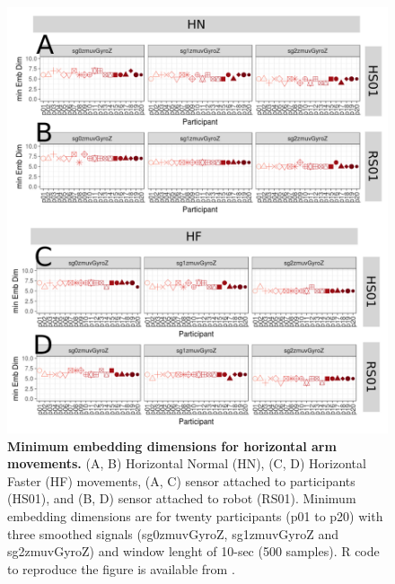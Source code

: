 \begin{figure}[!h]
\centering
\includegraphics[width=1.0\textwidth]{cao_aHw10}
	\caption{
	{\bf Minimum embedding dimensions for horizontal arm movements.} 
		(A, B) Horizontal Normal (HN), (C, D) Horizontal Faster (HF) 
		movements,
		(A, C) sensor attached to participants (HS01), and
		(B, D) sensor attached to robot (RS01).
		Minimum embedding dimensions are for twenty participants 
		(p01 to p20) with three smoothed signals 
		(sg0zmuvGyroZ, sg1zmuvGyroZ and sg2zmuvGyroZ)
		and window lenght of 10-sec (500 samples).
		R code to reproduce the figure is available 
		from \cite{hwum2018}.
        }
    \label{fig:caoH}
\end{figure}
